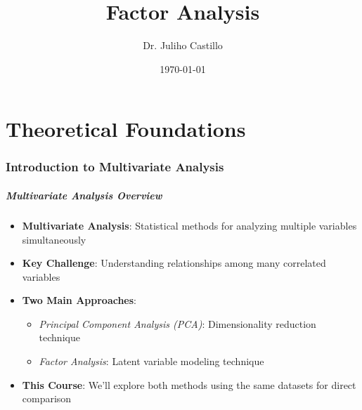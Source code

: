\documentclass[aspectratio=169]{beamer}
\title{Factor Analysis}
\author{Dr. Juliho Castillo}
\institute{Tecnológico de Monterrey}
\date{\today}
\begin{document}
\begin{frame}
    \titlepage
\end{frame}

\begin{frame}
    \tableofcontents
\end{frame}


\part{Theoretical Foundations}

\begin{frame}
    \partpage
\end{frame}

\section{Introduction to Multivariate Analysis}

\begin{frame}[fragile]
    \frametitle{Multivariate Analysis Overview}
    \begin{itemize}
        \item \textbf{Multivariate Analysis}: Statistical methods for analyzing multiple variables simultaneously \pause
        \item \textbf{Key Challenge}: Understanding relationships among many correlated variables \pause
        \item \textbf{Two Main Approaches}: 
              \begin{itemize}
                  \item \textit{Principal Component Analysis (PCA)}: Dimensionality reduction technique \pause
                  \item \textit{Factor Analysis}: Latent variable modeling technique \pause
              \end{itemize}
        \item \textbf{This Course}: We'll explore both methods using the same datasets for direct comparison
    \end{itemize}
\end{frame}
\end{document}
